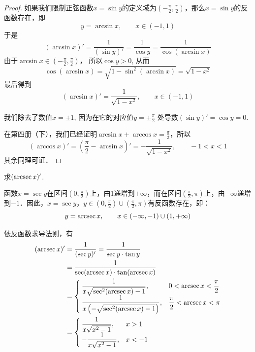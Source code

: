 \begin{proof}
如果我们限制正弦函数$x=\sin y$的定义域为$\left(-\frac{\pi}{2},\frac{\pi}{2}\right)$，那么$x=\sin y$的反函数存在，即
\[    y=\arcsin x,\qquad x\in (-1, 1)\]
于是
\[    (\arcsin x)'=\frac{1}{(\sin y)'}=\frac{1}{\cos y}=\frac{1}{\cos(\arcsin x)}\]
由于$\arcsin x\in \left(-\frac{\pi}{2},\frac{\pi}{2}\right)$，
所以$\cos y>0$, 从而
\[    \cos (\arcsin x) =\sqrt{1-\sin^2 (\arcsin x)} =\sqrt{1-x^2}\]
    最后得到
\[  (\arcsin x)'=\frac{1}{\sqrt{1-x^2}},\qquad x\in (-1, 1) \]

我们除去了数值$x=\pm 1$, 因为在它的对应值$y=\pm\frac{\pi}{2}$
处导数$(\sin y)'=\cos y=0$.

在第四册（下），我们已经证明$\arcsin x+\arccos x=\frac{\pi}{2}$，所以
\[(\arccos x)'=\left(\frac{\pi}{2}-\arcsin x\right)'=-\frac{1}{\sqrt{1-x^2}},\qquad -1<x<1\]
其余同理可证．
\end{proof}

\begin{example}
求$(\operatorname{arcsec} x)'$.
\end{example}


\begin{solution}
函数$x=\sec y$在区间$\left(0,\frac{\pi}{2}\right)$上，由1递增到$+\infty$，而在区间$\left(\frac{\pi}{2},\pi\right)$上，由$-\infty$递增到$-1$．因此，$x=\sec y$，$y\in\left(0,\frac{\pi}{2}\right)\cup \left(\frac{\pi}{2},\pi\right)$有反函数存在，即：
\[y=\operatorname{arcsec} x,\qquad x\in (-\infty,-1)\cup(1,+\infty)\]

依反函数求导法则，有
\begin{align*}
    (\operatorname{arcsec} x)'&=\dfrac{1}{(\sec y)'}=\dfrac{1}{\sec y\cdot \tan y}\\
    &=\dfrac{1}{\sec(\operatorname{arcsec} x)\cdot \tan(\operatorname{arcsec} x)}\\
    &=\begin{cases}
        \dfrac{1}{x\sqrt{\sec^2(\operatorname{arcsec} x)-1}}, & 0<\operatorname{arcsec} x<\dfrac{\pi}{2}\\
        \dfrac{1}{x\left(-\sqrt{\sec^2(\operatorname{arcsec} x)-1}\right)}, & \dfrac{\pi}{2}<\operatorname{arcsec} x<\pi \\
    \end{cases}\\
    &=\begin{cases}
        \dfrac{1}{x\sqrt{x^2-1}}, & x>1\\
       - \dfrac{1}{x\sqrt{x^2-1}}, & x<-1
    \end{cases}
\end{align*}
\end{solution}

